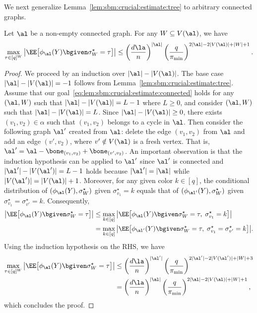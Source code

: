 \documentclass[11pt]{article}
\begin{document}
We next generalize Lemma~\ref{lem:sbm:crucial:estimate:tree} to arbitrary connected graphs.
\begin{lemma}\label{lem:sbm:crucial:estimate:connected}
Let $\al$ be a non-empty connected graph. For any $W\subseteq V(\al)$, we have
\begin{equation}\label{eq:lem:sbm:crucial:estimate:connected}
 \max_{\tau\in [q]^W}\left|\EE\big[\phi_{\al}(Y)\bgiven \sigma^\star_W=\tau\big]\right|\leq \left(\frac{d\la}{n}\right)^{|\al|}\left(\frac{q}{\pi_{\min}}\right)^{2|\al|-2|V(\al)|+|W|+1}.
\end{equation}
\end{lemma}
\begin{proof}
We proceed by an induction over $|\al|-|V(\al)|$. The base case $|\al|-|V(\al)|=-1$ follows from Lemma~\ref{lem:sbm:crucial:estimate:tree}. Assume that our goal~\eqref{eq:lem:sbm:crucial:estimate:connected} holds for any $(\al,W)$ such that $|\al|-|V(\al)|= L-1$ where $L\geq 0$, and consider $(\al,W)$ such that $|\al|-|V(\al)|=L$. Since $|\al|-|V(\al)|\geq 0$, there exists $(v_1,v_2)\in \alpha$ such that $(v_1,v_2)$ belongs to a cycle in $\al$. Then consider the following graph $\al'$ created from $\al$: delete the edge $(v_1,v_2)$ from $\al$ and add an edge $(v',v_2)$, where $v'\notin V(\al)$ is a fresh vertex. That is, $\al'=\al-\bone_{(v_1,v_2)}+\bone_{(v',v_2)}$. An important observation is that the induction hypothesis can be applied to $\al'$ since $\al'$ is connected and $|\al'|-|V(\al')|=L-1$ holds because $|\al'|=|\al|$ while $|V(\al')|=|V(\al)|+1$. Moreover, for any given color $k\in [q]$, the conditional distribution of $(\phi_{\al}(Y),\sigma^\star_W)$ given $\sigma^\star_{v_1}=k$ equals that of $(\phi_{\al'}(Y), \sigma^\star_W)$ given $\sigma^\star_{v_1}=\sigma^\star_{v'}=k$. Consequently,
\[
\begin{split}
  \big| \EE\big[\phi_{\al}(Y)\bgiven \sigma^\star_{W}=\tau\big]\big|
  &\leq   \max_{k\in[q]}\big|\EE\big[\phi_{\al}(Y)\bgiven \sigma^\star_{W}=\tau,\; \sigma^\star_{v_1}=k\big]\big|\\
  &=\max_{k\in [q]}\big|\EE\big[\phi_{\al'}(Y)\bgiven \sigma^\star_{W}=\tau,\;\sigma^\star_{v_1}=\sigma^\star_{v'}=k\big]\big|.
\end{split}
\]
Using the induction hypothesis on the RHS, we have
\[
\begin{split}
\max_{\tau\in [q]^W}\big| \EE\big[\phi_{\al}(Y)\bgiven \sigma^\star_{W}=\tau\big]\big|
&\leq \left(\frac{d\la}{n}\right)^{|\al'|}\left(\frac{q}{\pi_{\min}}\right)^{2|\al'|-2|V(\al')|+|W|+3}\\
&=\left(\frac{d\la}{n}\right)^{|\al|}\left(\frac{q}{\pi_{\min}}\right)^{2|\al|-2|V(\al)|+|W|+1},
\end{split}
\]
which concludes the proof.
\end{proof}
\end{document}
